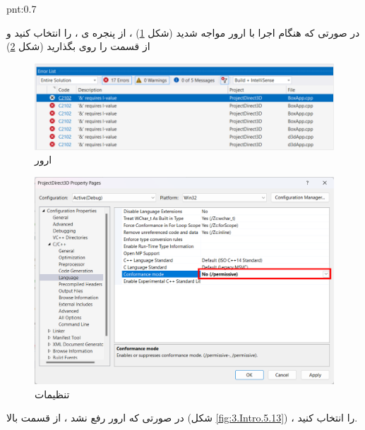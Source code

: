 \begin{point}{pnt:0.7}
{
    \Large
    \begin{spacing}{1.5}
        در صورتی که هنگام اجرا با ارور  مواجه شدید (شکل \ref{fig:3.Intro.5.11}) ،
        از پنجره ی  ،   را انتخاب کنید و از قسمت  را روی  بگذارید (شکل \ref{fig:3.Intro.5.12})

        \begin{figure}[H]
            \centering
            \setlength{\belowcaptionskip}{-10pt}
            \includegraphics[width=\textwidth]{Images/3/3.Intro.5.11}
            \caption{ارور }
            \label{fig:3.Intro.5.11}
        \end{figure}

        \begin{figure}[H]
            \centering
            \setlength{\belowcaptionskip}{-10pt}
            \includegraphics[width=\textwidth]{Images/3/3.Intro.5.12}
            \caption{تنظیمات }
            \label{fig:3.Intro.5.12}
        \end{figure}

        در صورتی که ارور رفع نشد ، از قسمت بالا (شکل \ref{fig:3.Intro.5.13}) ،  را انتخاب کنید.


\end{spacing}}
\end{point}
